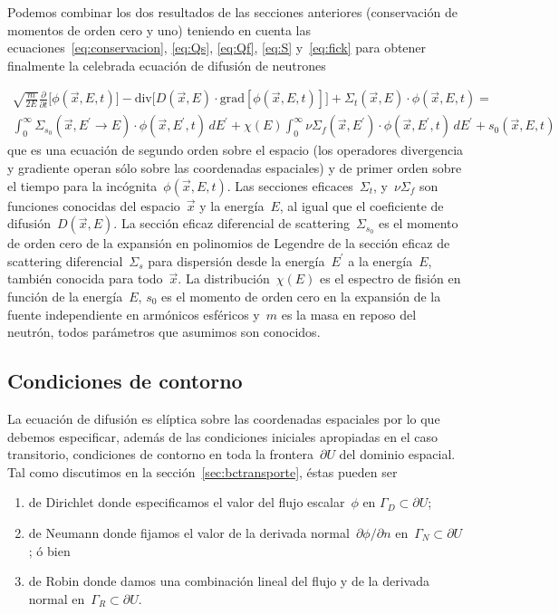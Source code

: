 Podemos combinar los dos resultados de las secciones anteriores (conservación de momentos de orden cero y uno) teniendo en cuenta las ecuaciones~\eqref{eq:conservacion}, \eqref{eq:Qs}, \eqref{eq:Qf}, \eqref{eq:S} y~\eqref{eq:fick} para obtener finalmente la celebrada ecuación de difusión de neutrones

\begin{multline}\label{eq:difusion}
 \sqrt{\frac{m}{2E}} \frac{\partial}{\partial t} \Big[ \phi(\vec{x}, E, t) \Big]
 - \text{div} \Big[ D(\vec{x}, E) \cdot \text{grad} \left[ \phi(\vec{x}, E, t) \right] \Big]
 + \Sigma_t(\vec{x}, E) \cdot \phi(\vec{x}, E, t)
 = \\
\int_{0}^{\infty} \Sigma_{s_0}(\vec{x}, E^{\prime} \rightarrow E)  \cdot \phi(\vec{x}, E^\prime, t) \, dE^\prime +
\chi(E) \int_{0}^{\infty} \nu\Sigma_f(\vec{x}, E^\prime) \cdot \phi(\vec{x}, E^\prime, t) \, dE^\prime
+ s_0(\vec{x}, E, t)
\end{multline}
%
que es una ecuación de segundo orden sobre el espacio (los operadores divergencia y gradiente operan sólo sobre las coordenadas espaciales) y de primer orden sobre el tiempo para la incógnita~$\phi(\vec{x}, E,t)$. Las secciones eficaces~$\Sigma_t$, y~$\nu\Sigma_f$ son funciones conocidas del espacio~$\vec{x}$ y la energía~$E$, al igual que el coeficiente de difusión~$D(\vec{x},E)$. La sección eficaz diferencial de scattering~$\Sigma_{s_0}$ es el momento de orden cero de la expansión en polinomios de Legendre de la sección eficaz de scattering diferencial~$\Sigma_s$ para dispersión desde la energía~$E^\prime$ a la energía~$E$, también conocida para todo~$\vec{x}$. La distribución~$\chi(E)$ es el espectro de fisión en función de la energía~$E$, $s_0$ es el momento de orden cero en la expansión de la fuente independiente en armónicos esféricos y~$m$ es la masa en reposo del neutrón, todos parámetros que asumimos son conocidos.


\subsection{Condiciones de contorno} %
\label{sec:bcdifusion}

La ecuación de difusión es elíptica sobre las coordenadas espaciales por lo que debemos especificar, además de las condiciones iniciales apropiadas en el caso transitorio, condiciones de contorno en toda la frontera~$\partial U$ del dominio espacial. Tal como discutimos en la sección~\ref{sec:bctransporte}, éstas pueden ser

 \begin{enumerate}
  \item de Dirichlet donde especificamos el valor del flujo escalar~$\phi$ en $\Gamma_D \subset \partial U$;
  \item de Neumann donde fijamos el valor de la derivada normal~$\partial \phi/\partial n$ en~$\Gamma_N \subset \partial U$; ó bien
  \item de Robin donde damos una combinación lineal del flujo y de la derivada normal en~$\Gamma_R \subset \partial U$.
 \end{enumerate}

